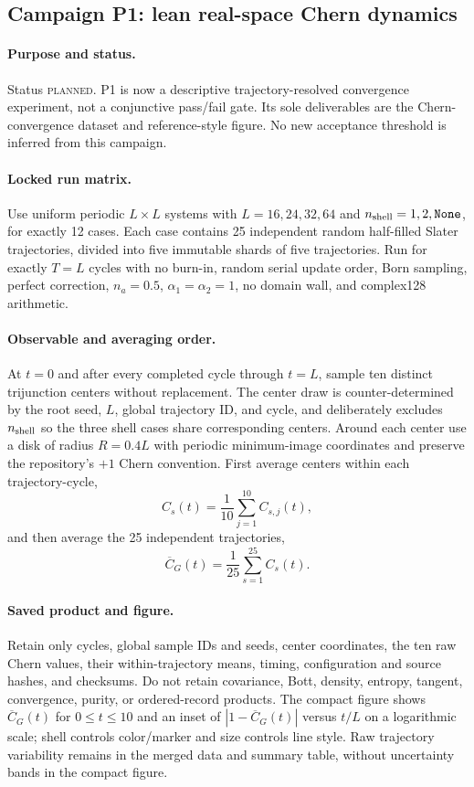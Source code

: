 \documentclass[aps,prx,onecolumn,nofootinbib,superscriptaddress,longbibliography]{revtex4-2}
\newcommand{\planned}{\textsc{planned}}
\begin{document}
\subsection{Campaign P1: lean real-space Chern dynamics}
\paragraph{Purpose and status.}
Status \planned.  P1 is now a descriptive trajectory-resolved convergence experiment,
not a conjunctive pass/fail gate.  Its sole deliverables are the Chern-convergence dataset
and reference-style figure.  No new acceptance threshold is inferred from this campaign.

\paragraph{Locked run matrix.}
Use uniform periodic $L\times L$ systems with $L=16,24,32,64$ and
$n_{\rm shell}=1,2,\texttt{None}$, for exactly 12 cases.  Each case contains 25
independent random half-filled Slater trajectories, divided into five immutable shards of
five trajectories.  Run for exactly $T=L$ cycles with no burn-in, random serial update
order, Born sampling, perfect correction, $n_a=0.5$, $\alpha_1=\alpha_2=1$, no domain
wall, and complex128 arithmetic.

\paragraph{Observable and averaging order.}
At $t=0$ and after every completed cycle through $t=L$, sample ten distinct trijunction
centers without replacement.  The center draw is counter-determined by the root seed,
$L$, global trajectory ID, and cycle, and deliberately excludes $n_{\rm shell}$ so the
three shell cases share corresponding centers.  Around each center use a disk of radius
$R=0.4L$ with periodic minimum-image coordinates and preserve the repository's $+1$
Chern convention.  First average centers within each trajectory-cycle,
\begin{equation}
 C_s(t)=\frac1{10}\sum_{j=1}^{10} C_{s,j}(t),
\end{equation}
and then average the 25 independent trajectories,
\begin{equation}
 \overline C_G(t)=\frac1{25}\sum_{s=1}^{25} C_s(t).
\end{equation}

\paragraph{Saved product and figure.}
Retain only cycles, global sample IDs and seeds, center coordinates, the ten raw Chern
values, their within-trajectory means, timing, configuration and source hashes, and
checksums.  Do not retain covariance, Bott, density, entropy, tangent, convergence,
purity, or ordered-record products.  The compact figure shows $\overline C_G(t)$ for
$0\leq t\leq10$ and an inset of $|1-\overline C_G(t)|$ versus $t/L$ on a logarithmic
scale; shell controls color/marker and size controls line style.  Raw trajectory
variability remains in the merged data and summary table, without uncertainty bands in
the compact figure.
\end{document}
